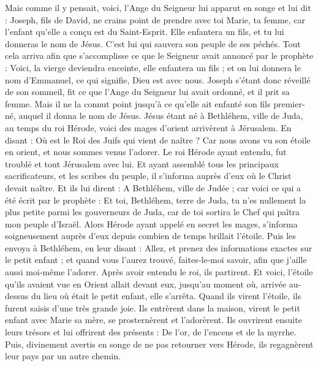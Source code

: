 \begin{multicols}{2}
Mais comme il y pensait, voici, l'Ange du Seigneur lui apparut en songe et lui dit : Joseph, fils de David, ne crains point de prendre avec toi Marie, ta femme, car l'enfant qu'elle a conçu est du Saint-Esprit.
Elle enfantera un fils, et tu lui donneras le nom de Jésus. C'est lui qui sauvera son peuple de ses péchés.
Tout cela arriva afin que s'accomplisse ce que le Seigneur avait annoncé par le prophète :
Voici, la vierge deviendra enceinte, elle enfantera un fils ; et on lui donnera le nom d'Emmanuel, ce qui signifie, Dieu est avec nous.
Joseph s'étant donc réveillé de son sommeil, fit ce que l'Ange du Seigneur lui avait ordonné, et il prit sa femme.
Mais il ne la connut point jusqu'à ce qu'elle ait enfanté son fils premier-né, auquel il donna le nom de Jésus.
\VerseOne{}Jésus étant né à Bethléhem, ville de Juda, au temps du roi Hérode, voici des mages d'orient arrivèrent à Jérusalem.
En disant : Où est le Roi des Juifs qui vient de naître ? Car nous avons vu son étoile en orient, et nous sommes venus l'adorer.
Le roi Hérode ayant entendu, fut troublé et tout Jérusalem avec lui.
Et ayant assemblé tous les principaux sacrificateurs, et les scribes du peuple, il s'informa auprès d'eux où le Christ devait naître.
Et ils lui dirent : A Bethléhem, ville de Judée ; car voici ce qui a été écrit par le prophète :
Et toi, Bethléhem, terre de Juda, tu n'es nullement la plus petite parmi les gouverneurs de Juda, car de toi sortira le Chef qui paîtra mon peuple d'Israël.
Alors Hérode ayant appelé en secret les mages, s'informa soigneusement auprès d'eux depuis combien de temps brillait l'étoile.
Puis les envoya à Bethléhem, en leur disant : Allez, et prenez des informations exactes sur le petit enfant ; et quand vous l'aurez trouvé, faites-le-moi savoir, afin que j'aille aussi moi-même l'adorer.
Après avoir entendu le roi, ils partirent. Et voici, l'étoile qu'ils avaient vue en Orient allait devant eux, jusqu'au moment où, arrivée au-dessus du lieu où était le petit enfant, elle s'arrêta.
Quand ils virent l'étoile, ils furent saisis d'une très grande joie.
Ils entrèrent dans la maison, virent le petit enfant avec Marie sa mère, se prosternèrent et l'adorèrent. Ils ouvrirent ensuite leurs trésors et lui offrirent des présents : De l'or, de l'encens et de la myrrhe.
Puis, divinement avertis en songe de ne pas retourner vers Hérode, ils regagnèrent leur pays par un autre chemin.

\end{multicols}
